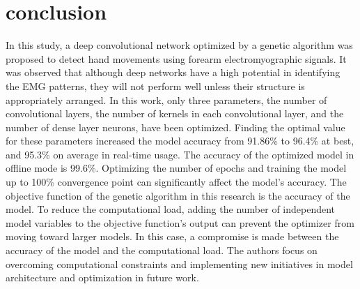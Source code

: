 \section{conclusion}
In this study, a deep convolutional network optimized by a genetic algorithm was proposed to detect hand movements using forearm electromyographic signals. It was observed that although deep networks have a high potential in identifying the EMG patterns, they will not perform well unless their structure is appropriately arranged. In this work, only three parameters, the number of convolutional layers, the number of kernels in each convolutional layer, and the number of dense layer neurons, have been optimized. Finding the optimal value for these parameters increased the model accuracy from 91.86\% to 96.4\% at best, and 95.3\% on average in real-time usage. The accuracy of the optimized model in offline mode is 99.6\%. Optimizing the number of epochs and training the model up to 100\% convergence point can significantly affect the model's accuracy. The objective function of the genetic algorithm in this research is the accuracy of the model. To reduce the computational load, adding the number of independent model variables to the objective function's output can prevent the optimizer from moving toward larger models. In this case, a compromise is made between the accuracy of the model and the computational load. The authors focus on overcoming computational constraints and implementing new initiatives in model architecture and optimization in future work.